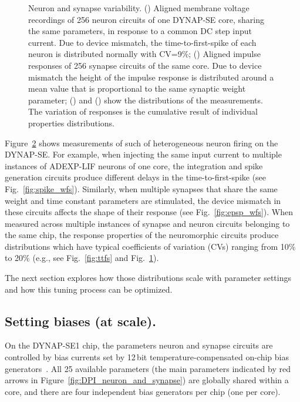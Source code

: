 \begin{figure}[h]
\begin{subfigure}{.475\textwidth}
    \subcaption{}
    \label{fig:wfs_dist}
  \end{subfigure}
  \caption[Neuron and synapse variability.]{Neuron and synapse variability.
() Aligned membrane voltage recordings of 256 neuron circuits of one DYNAP-SE core, sharing the same parameters,   in response to a common DC step input current.
Due to device mismatch, the time-to-first-spike of each neuron is distributed normally with CV=9\%; () Aligned impulse responses of 256 synapse circuits of the same core.
Due to device mismatch the height of the impulse response is distributed around a mean value that is proportional to the same synaptic weight parameter; () and () show the distributions of the measurements.
  The variation of responses is the cumulative result of individual properties distributions.}
  \label{fig:variability}
\end{figure}


Figure~\ref{fig:variability} shows measurements of such of heterogeneous neuron firing on the DYNAP-SE\@.
For example, when injecting the same input current to multiple instances of \ac{ADEXP-LIF} neurons of one core, the integration and spike generation circuits produce different delays in the time-to-first-spike (see Fig.~\ref{fig:spike_wfs}).
Similarly, when multiple synapses that share the same weight and time constant parameters are stimulated, the device mismatch in these circuits affects the shape of their response (see Fig.~\ref{fig:epsp_wfs}).
When measured across multiple instances of synapse and neuron circuits belonging to the same chip, the response properties of the neuromorphic circuits produce distributions which have typical coefficients of variation (CVs) ranging from 10\% to 20\% (e.g., see Fig.~\ref{fig:ttfs} and Fig.~\ref{fig:wfs_dist}).


The next section explores how those distributions scale with parameter settings and how this tuning process can be optimized.


\subsection{Setting biases (at scale).}

On the DYNAP-SE1 chip, the parameters neuron and synapse circuits are controlled by bias currents set by 12\,bit temperature-compensated on-chip bias generators~\cite{Delbruck_etal10}.
All 25 available parameters (the main parameters indicated by red arrows in Figure~\ref{fig:DPI_neuron_and_synapse}) are globally shared within a core, and there are four independent bias generators per chip (one per core).

